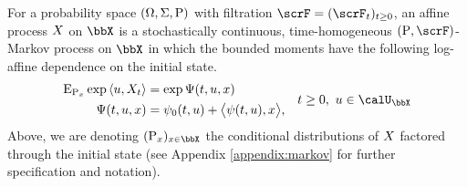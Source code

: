 \begin{definition}
  \label{definition:affine-process}
  For a probability space $(\Omega, \Sigma, {\operatorname{P}})$ with filtration $\scrF = (\scrF_t)_{t\geq0}$, an affine process $X$ on $\stateSpace$ is a stochastically continuous, time-homogeneous $(\Prb, \scrF)$-Markov process on $\stateSpace$ in which the bounded moments have the following log-affine dependence on the initial state.
  \begin{align}
    \label{eq:affine-definition}
    &\begin{aligned}
      \Exp_{\Prb_\stateVar}\exp\prj{\momentVar}{\X_t} &= \exp\aff(t, \momentVar, \stateVar) \\
      \aff(t, \momentVar, \stateVar) &= \affPart_0(t, \momentVar) + \bprj{\affPart(t, \momentVar)}{\stateVar},  \\
    \end{aligned}
    & t \geq 0, ~ \momentVar \in \boundedSpace
  \end{align}
  Above, we are denoting $(\Prb_\stateVar)_{\stateVar\in\stateSpace}$ the conditional distributions of $X$ factored through the initial state (see Appendix \ref{appendix:markov} for further specification and notation).
\end{definition}
